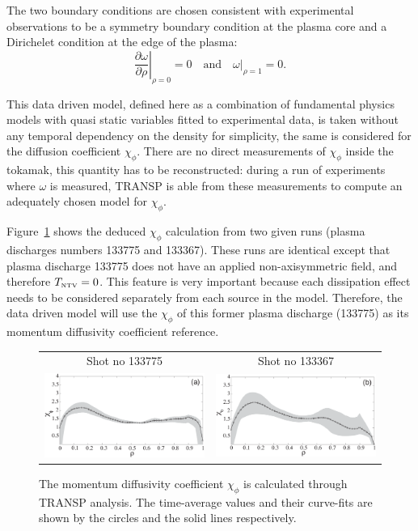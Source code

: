 \documentclass[12pt]{iopart}
\begin{document}
The two boundary conditions are chosen consistent with experimental observations to be a symmetry boundary condition at the plasma core and a Dirichelet condition at the edge of the plasma:
\begin{equation}
\left.\frac{\partial\omega}{\partial\rho}\right|_{\rho=0} = 0 
\quad \textrm{and} \quad 
\left.\omega\right|_{\rho=1} = 0.
\label{bc0}
\end{equation}

This data driven model, defined here as a combination of fundamental physics models with quasi static variables fitted to experimental data,  is taken without any temporal dependency on the density  for simplicity, the same is considered for the diffusion coefficient $\chi_\phi$. There are no direct measurements of $\chi_\phi$ inside the tokamak, this quantity has to be reconstructed: during a run of experiments where $\omega$ is measured, TRANSP is able from these measurements to compute an adequately chosen model for  $\chi_\phi$. 

Figure~{\ref{fig:chiphi}} shows the deduced $\chi_\phi$ calculation from two given runs (plasma discharges numbers 133775 and 133367). These runs are identical except that plasma discharge 133775 does not have an applied non-axisymmetric field, and therefore $T_\textrm{\tiny NTV} = 0$. This feature is very important because each dissipation effect needs to be considered separately from each source in the model. Therefore, the data driven model will use the $\chi_\phi$ of this former plasma discharge (133775) as its momentum diffusivity coefficient reference.

\begin{figure} \centering
\begin{tabular}{cc}
Shot no 133775  & Shot no 133367 \\
\includegraphics[width=0.45\linewidth]{imene_figs/CHIPHI1} &  
\includegraphics[width= 0.45\linewidth]{imene_figs/CHIPHI2} \\
\end{tabular}
\caption{The momentum diffusivity coefficient $ \chi_{\phi}$ is calculated through TRANSP analysis. The time-average values and their curve-fits are shown by the circles  and the solid lines respectively.}
\label{fig:chiphi}
\end{figure}
\end{document}

